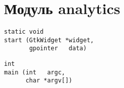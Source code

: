 \section{Модуль analytics}

\begin{verbatim}
static void
start (GtkWidget *widget,
       gpointer   data)
\end{verbatim}

\begin{verbatim}
int
main (int   argc,
      char *argv[])
\end{verbatim}
